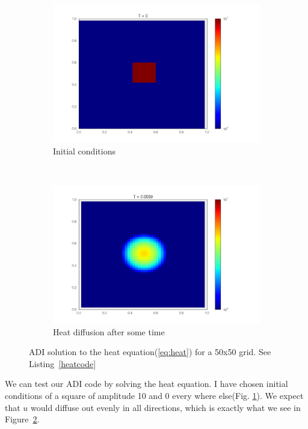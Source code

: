 \documentclass[paper=a4, fontsize=11pt, abstract=on]{scrartcl} %
\numberwithin{equation}{section}
\numberwithin{figure}{section}
\numberwithin{table}{section}
\begin{document}
\begin{figure}
  \centering
  \begin{subfigure}[b]{0.65\textwidth}
    \includegraphics[width=\textwidth]{heat0}
    \caption{Initial conditions}
    \label{fig:heatinit}
  \end{subfigure}
 ~ %
 \begin{subfigure}[b]{0.65\textwidth}
   \includegraphics[width=\textwidth]{heatlong}
   \caption{Heat diffusion after some time}
   \label{fig:heatlong}
 \end{subfigure}
 \label{fig:heat}
     \caption{ADI solution to the heat equation(\ref{eq:heat}) for a 50x50 grid. See Listing~\ref{heatcode}}
\end{figure}

We can test our ADI code by solving the heat equation. I have chosen initial conditions of a square of amplitude 10 and 0 every where else(Fig. \ref{fig:heatinit}). We expect that $u$ would diffuse out evenly in all directions, which is exactly what we see in Figure~\ref{fig:heatlong}. 
\end{document}
